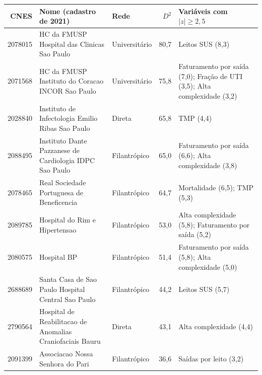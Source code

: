\begin{tabular}{r>{\raggedright\arraybackslash}p{4.6cm}lr>{\raggedright\arraybackslash}p{4.2cm}}
\toprule
CNES & Nome (cadastro de 2021) & Rede & $D^2$ & Variáveis com $|z| \ge 2{,}5$ \\
\midrule
2078015 & HC da FMUSP Hospital das Clinicas Sao Paulo & Universitário & 80,7 & Leitos SUS (8,3) \\
2071568 & HC da FMUSP Instituto do Coracao INCOR Sao Paulo & Universitário & 75,8 & Faturamento por saída (7,0); Fração de UTI (3,5); Alta complexidade (3,2) \\
2028840 & Instituto de Infectologia Emilio Ribas Sao Paulo & Direta & 65,8 & TMP (4,4) \\
2088495 & Instituto Dante Pazzanese de Cardiologia IDPC Sao Paulo & Filantrópico & 65,0 & Faturamento por saída (6,6); Alta complexidade (3,8) \\
2078465 & Real Sociedade Portuguesa de Beneficencia & Filantrópico & 64,7 & Mortalidade (6,5); TMP (5,3) \\
2089785 & Hospital do Rim e Hipertensao & Filantrópico & 53,0 & Alta complexidade (5,8); Faturamento por saída (5,2) \\
2080575 & Hospital BP & Filantrópico & 51,4 & Faturamento por saída (5,8); Alta complexidade (5,0) \\
2688689 & Santa Casa de Sao Paulo Hospital Central Sao Paulo & Filantrópico & 44,2 & Leitos SUS (5,7) \\
2790564 & Hospital de Reabilitacao de Anomalias Craniofaciais Bauru & Direta & 43,1 & Alta complexidade (4,4) \\
2091399 & Associacao Nossa Senhora do Pari & Filantrópico & 36,6 & Saídas por leito (3,2) \\
\bottomrule
\end{tabular}
